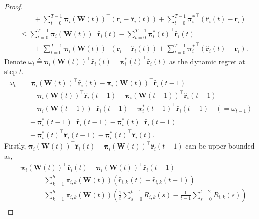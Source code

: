 \documentclass[10pt]{article}
\def\rvr{{\mathbf{r}}}
\def\rvpi{{\boldsymbol{\pi}}}
\def\rmW{{\mathbf{W}}}
\begin{document}
\begin{proof}
\begin{equation}
\begin{split}
    &\qquad + \sum\limits_{t=0}^{T-1}{ \rvpi_i\left(\rmW(t)\right)^\top \left( \rvr_i - \hat{\rvr}_i(t) \right) } + \sum\limits_{t=0}^{T-1}{ {\rvpi_i^*}^\top \left( \hat{\rvr}_i(t) - \rvr_i \right) } \\
    &\le \sum\limits_{t=0}^{T-1}{ \rvpi_i\left(\rmW(t)\right)^\top \hat{\rvr}_i(t)} - \sum\limits_{t=0}^{T-1}{ {\rvpi_i^*(t)}^\top \hat{\rvr}_i(t)} \\
    &\qquad + \sum\limits_{t=0}^{T-1}{ \rvpi_i\left(\rmW(t)\right)^\top \left( \rvr_i - \hat{\rvr}_i(t) \right) } + \sum\limits_{t=0}^{T-1}{ {\rvpi_i^*}^\top \left( \hat{\rvr}_i(t) - \rvr_i \right) }.
\end{split}
\end{equation}
Denote $\omega_t \triangleq \rvpi_i\left(\rmW(t)\right)^\top \hat{\rvr}_i(t) - {\rvpi_i^*(t)}^\top \hat{\rvr}_i(t)$ as the dynamic regret at step $t$.
\begin{equation}
\label{eq:dynamic_regret_decomposition}
\begin{split}
    \omega_t &= \rvpi_i\left(\rmW(t)\right)^\top \hat{\rvr}_i(t) - \rvpi_i\left(\rmW(t)\right)^\top \hat{\rvr}_i(t-1) \\
    &\quad + \rvpi_i\left(\rmW(t)\right)^\top \hat{\rvr}_i(t-1) - \rvpi_i\left(\rmW(t-1)\right)^\top \hat{\rvr}_i(t-1) \\
    &\quad + \rvpi_i\left(\rmW(t-1)\right)^\top \hat{\rvr}_i(t-1) - {\rvpi_i^*(t-1)}^\top \hat{\rvr}_i(t-1) \quad \left( = \omega_{t-1} \right) \\
    &\quad + {\rvpi_i^*(t-1)}^\top \hat{\rvr}_i(t-1) - {\rvpi_i^*(t)}^\top \hat{\rvr}_i(t-1) \\
    &\quad + {\rvpi_i^*(t)}^\top \hat{\rvr}_i(t-1) - {\rvpi_i^*(t)}^\top \hat{\rvr}_i(t).
\end{split}
\end{equation}
Firstly, $\rvpi_i\left(\rmW(t)\right)^\top \hat{\rvr}_i(t) - \rvpi_i\left(\rmW(t)\right)^\top \hat{\rvr}_i(t-1)$ can be upper bounded as,
\begin{equation}
\label{eq:first_term_upper_bound}
\begin{split}
    &\rvpi_i\left(\rmW(t)\right)^\top \hat{\rvr}_i(t) - \rvpi_i\left(\rmW(t)\right)^\top \hat{\rvr}_i(t-1) \\
    &\qquad = \sum\limits_{k=1}^{h}{ \pi_{i,k}\left(\rmW(t)\right) \left( \hat{r}_{i,k}(t) - \hat{r}_{i,k}(t-1) \right) } \\
    &\qquad = \sum\limits_{k=1}^{h}{ \pi_{i,k}\left(\rmW(t)\right) \left( \frac{1}{t} \sum\limits_{s=0}^{t-1}{R_{i,k}(s)} - \frac{1}{t-1} \sum\limits_{s=0}^{t-2}{R_{i,k}(s)} \right) } \\

\end{split}
\end{equation}
\end{proof}
\end{document}
